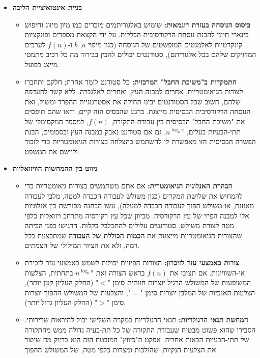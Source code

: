 \documentclass[11pt, a4paper]{article}
\begin{document}
\begin{itemize}

    \item \textbf{בניית אינטואיציית הליבה}
    \begin{itemize}
        \item \textbf{ביסוס הנוסחה בעזרת דוגמאות:} שימוש באלגוריתמים מוכרים כמו מיון מיזוג וחיפוש בינארי חיוני להבנת נוסחת הרקורסיבית הכללית. על ידי הקצאת מספרים ופונקציות קונקרטיות לאלמנטים המופשטים של הנוסחה (כגון מיפוי $a$, $b$ ו-$f(n)$ לערכים המדויקים שלהם בכל אלגוריתם), סטודנטים יכולים להבין בבירור מה כל רכיב מתמטי מייצג בפועל.
        \item \textbf{התמקדות ב"משיכת החבל" המרכזית:} כל סטודנט לומד אחרת; חלקם יתחברו לצורות הגיאומטריות, אחרים למבנה העץ, ואחרים לאלגברה. ללא קשר להעדפה שלהם, חשוב שכל הסטודנטים יבינו תחילה את אסטרטגיית ההפרד ומשול, ואת הנוסחה הרקורסיבית הבסיסית מייצגת. ברגע שהבסיס הזה קיים, ודאו שהם תופסים את "משיכת החבל" הבסיסית בין עבודת התקורה, $f(n)$, למספר המקסימלי של תתי-הבעיות בעלים, $n^{\log_b a}$. גם אם סטודנט נאבק במבנה העץ ובסכומים, הבנת הפשרה הבסיסית הזו מאפשרת לו להשתמש בהצלחה בצורות הגיאומטריות כדי לזכור וליישם את המשפט.
    \end{itemize}

    \item \textbf{ניווט בין ההמחשות הוויזואליות}
    \begin{itemize}
        \item \textbf{הבהרת האנלוגיה הגיאומטרית:} אם אתם משתמשים בצורות גיאומטריות כדי להמחיש את שלושת המקרים (כגון משולש לעבודה הכבדה למטה, מלבן לעבודה מאוזנת, או משולש הפוך לעבודה הכבדה למעלה), עשו הבחנה מפורשת בין אנלוגיות אלו למבנה הפיזי של עץ הרקורסיה. מכיוון שכל עץ רקורסיה מתרחב ויזואלית כלפי מטה לצורת משולש, סטודנטים עלולים להתבלבל בקלות. הדגישו בפני הכיתה שהצורות הגיאומטריות מייצגות את ה\textbf{כמות הכוללת של העבודה} שמתבצעת בכל רמה, ולא את הציור המילולי של הצמתים.
        \item \textbf{צורות כאמצעי עזר לזיכרון:} הצורות הפיזיות יכולות לשמש כאמצעי עזר לזכירת אי-השוויונות. אם תציבו את $f(n)$ בראש הצורה ואת $n^{\log_b a}$ בתחתית, הצלעות המשופעות של המשולש הרגיל יוצרות חזותית סימן "$<$" (החלק העליון קטן יותר), הצלעות האנכיות של המלבן יוצרות סימן "$=$", והצלעות של המשולש ההפוך יוצרות סימן "$>$" (החלק העליון גדול יותר).
        \item \textbf{המחשת תנאי הרגולריות:} תנאי הרגולריות במקרה השלישי יכול להיראות שרירותי. הסבירו שהוא פשוט מבטיח שעבודת התקורה של כל תת-בעיה גדולה ממש מהתקורה של תתי-הבעיות הבאות אחריה. אפקט ה"כיווץ" המובטח הזה הוא בדיוק מה שיוצר את הצלעות הנקיות, שהולכות ומצרות כלפי מטה, של המשולש ההפוך.
    \end{itemize}


\end{itemize}
\end{document}
